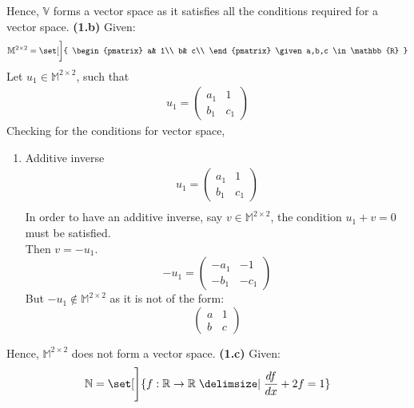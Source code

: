 \documentclass[12pt,letterpaper,fleqn]{article}
\theoremstyle{definition}
\begin{document}
Hence, $\mathbb{V}$ forms a vector space as it satisfies all the conditions required for a vector space.
\newpage
\textbf{(1.b)} Given:
 \begin{align}
\mathbb{M}^{2\times2} = \set[\bigg]{
\begin{pmatrix}
a& 1\\
b& c\\
\end{pmatrix}
\given a,b,c \in \mathbb{R}
} 
\end{align}
Let $u_1 \in \mathbb{M}^{2 \times 2}$, such that
\begin{equation*}
\begin{split}
u_1 = \begin{pmatrix}
a_1 &1\\
b_1 &c_1
\end{pmatrix}
\end{split}
\end{equation*}
Checking for the conditions for vector space,
\begin{enumerate}
\item Additive inverse
\begin{equation*}
\begin{split}
u_1 = \begin{pmatrix}
a_1 &1\\
b_1 &c_1
\end{pmatrix}\\
\end{split}
\end{equation*}
In order to have an additive inverse, say $v \in \mathbb{M}^{2 \times 2}$, the condition $ u_1 + v = 0$ must be satisfied.\\
Then $v = -u_1$.
\begin{equation*}
-u_1 = 
\begin{pmatrix}
-a_1 &-1\\
-b_1 &-c_1
\end{pmatrix}
\end{equation*}
But $-u_1 \notin \mathbb{M}^{2 \times 2}$ as it is not of the form:
\begin{equation*}
\begin{pmatrix}
a &1\\
b &c
\end{pmatrix}
\end{equation*}
\end{enumerate}
Hence, $\mathbb{M}^{2 \times 2}$ does not form a vector space.
\newpage
 \textbf{(1.c)} Given:
 \begin{align*}
 \mathbb{N} = \set[\Bigg]{f: \mathbb{R} \rightarrow \mathbb{R} \given \frac{df}{dx} + 2f = 1}
 \end{align*}
\end{document}
